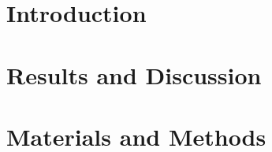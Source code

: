 \documentclass{Thesis}
\begin{document}
\frontmatter

\part{Introduction}
	
	
	
	
	
	


\part{Results and Discussion}
	
	
%	


\part{Materials and Methods}






\end{document}
